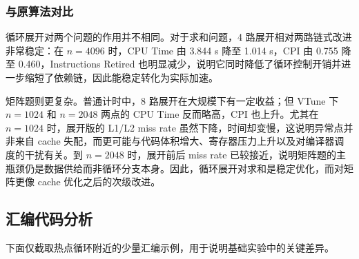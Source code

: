 ﻿\documentclass[UTF8,a4paper,12pt]{ctexart}
\newcommand{\xcompacttablefont}{\fontsize{8.6pt}{9.1pt}\selectfont}
\begin{document}
\begin{table}[H]
    \centering
    \xcompacttablefont
    \setlength{\tabcolsep}{4.0pt}
    \renewcommand{\arraystretch}{1.03}
    \caption{\(n\) 个数求和循环展开前后 profiling 对比}
    \label{tab:unroll-sum-profile}
\end{table}

\subsubsection{与原算法对比}
循环展开对两个问题的作用并不相同。对于求和问题，4 路展开相对两路链式改进非常稳定：在 \(n=4096\) 时，CPU Time 由 3.844 s 降至 1.014 s，CPI 由 0.755 降至 0.460，Instructions Retired 也明显减少，说明它同时降低了循环控制开销并进一步缩短了依赖链，因此能稳定转化为实际加速。

矩阵题则更复杂。普通计时中，8 路展开在大规模下有一定收益；但 VTune 下 \(n=1024\) 和 \(n=2048\) 两点的 CPU Time 反而略高，CPI 也上升。尤其在 \(n=1024\) 时，展开版的 L1/L2 miss rate 虽然下降，时间却变慢，这说明异常点并非来自 cache 失配，而更可能与代码体积增大、寄存器压力上升以及对编译器调度的干扰有关。到 \(n=2048\) 时，展开前后 miss rate 已较接近，说明矩阵题的主瓶颈仍是数据供给而非循环分支本身。因此，循环展开对求和是稳定优化，而对矩阵更像 cache 优化之后的次级改进。

\subsection{汇编代码分析}
下面仅截取热点循环附近的少量汇编示例，用于说明基础实验中的关键差异。
\end{document}
